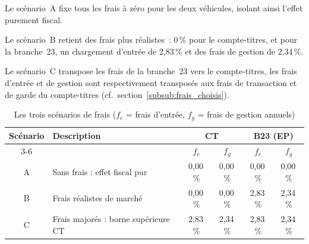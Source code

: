 ﻿\documentclass[12pt, a4paper]{article}
\begin{document}
Le scénario~A fixe tous les frais à zéro pour les deux véhicules, 
isolant ainsi l'effet purement fiscal.

Le scénario~B retient des frais plus réalistes~: 0\,\% pour le compte-titres,
et pour la branche~23, un chargement d'entrée de 2,83\,\%\cite[p.~27]{fsma_couts_piliers} 
et des frais de gestion de 2,34\,\%\cite[p.~30]{fsma_couts_piliers}.

Le scénario~C transpose les frais de la branche~23 vers le compte-titres,
les frais d'entrée et de gestion sont respectivement
transposés aux frais de transaction et de garde du compte-titres
(cf.~section~\ref{subsub:frais_choisis}).

\begin{table}[h!]
  \centering
  \caption{Les trois scénarios de frais ($f_e$ = frais d'entrée, $f_g$ = frais de gestion annuels)}
  \label{tab:scenarii_frais}
  \begin{tabular}{|c|l|c|c|c|c|}
    \hline
    \textbf{Scénario} & \textbf{Description} &
      \multicolumn{2}{c|}{\textbf{CT}} &
      \multicolumn{2}{c|}{\textbf{B23 (EP)}} \\
    \cline{3-6}
    & & $f_e$ & $f_g$ & $f_e$ & $f_g$ \\
    \hline
    A & Sans frais : effet fiscal pur   & 0,00\,\% & 0,00\,\% & 0,00\,\% & 0,00\,\% \\
    \hline
    B & Frais réalistes de marché         & 0,00\,\% & 0,00\,\% & 2,83\,\% & 2,34\,\% \\
    \hline
    C & Frais majorés : borne supérieure CT & 2,83\,\% & 2,34\,\% & 2,83\,\% & 2,34\,\% \\
    \hline
  \end{tabular}
\end{table}
\end{document}
